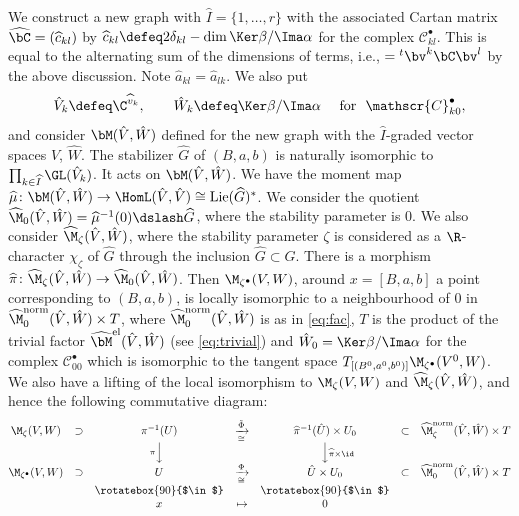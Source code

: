 We construct a new graph with $\widehat I = \{1, \dots, r\}$ with the
associated Cartan matrix $\widehat{\bC} = (\widehat{c}_{kl})$ by
\(
  \widehat{c}_{kl} \defeq 2\delta_{kl} - \dim \Ker\beta/\Ima\alpha
\)
for the complex $\mathscr{C}^\bullet_{kl}$.
This is equal to the alternating sum of the dimensions of terms,
i.e.,
\(
  = {}^t \bv^k \bC \bv^l
\)
by the above discussion. Note $\widehat{a}_{kl} = \widehat{a}_{lk}$.
%
We also put
\begin{equation*}
   \hat V_k \defeq \C^{\widehat{v}_k}, \qquad
   \hat W_k \defeq \text{$\Ker\beta/\Ima\alpha$ \quad
     for \   $\mathscr{C}_{k0}^\bullet$},
\end{equation*}
and consider $\bM(\hat V,\hat W)$ def\/ined for the new graph
with the $\widehat I$-graded vector spaces $\hat V$, $\hat W$.
The stabilizer $\widehat G$ of $(B,a,b)$ is naturally isomorphic to
$\prod_{k\in\widehat I} \GL(\hat V_k)$. It acts on $\bM(\hat V,\hat
W)$. We have the moment map $\widehat\mu\colon\bM(\hat V,\hat W)\to
\HomL(\hat V,\hat V) \cong \operatorname{Lie}(\widehat G)^*$. We
consider the quotient
$\widehat\M_0(\Hat{V},\Hat{W}) = \widehat\mu^{-1}(0)\dslash \widehat
G$, where the stability parameter is $0$.
%
We also consider $\widehat\M_\zeta(\Hat{V},\Hat{W})$, where the
stability parameter $\zeta$ is considered as a $\R$-character
$\chi_{\zeta}$ of $\widehat G$ through the inclusion $\widehat
G\subset G$. There is a morphism
$\widehat\pi\colon \widehat\M_\zeta(\Hat{V},\Hat{W})
\to \widehat\M_0(\Hat{V},\Hat{W})$.
%
Then \cite[3.2.1]{Na-qaff} $\M_{\zeta^\bullet}(V,W)$, around $x =
[B,a,b]$ a point corresponding to $(B,a,b)$, is locally isomorphic to
a neighbourhood of $0$ in
$\widehat\M_0^{\text{norm}}(\Hat{V},\Hat{W})\times T$, where
$\widehat\M_0^{\text{norm}}(\Hat{V},\Hat{W})$ is as in \eqref{eq:fac},
%
$T$ is the product of the trivial factor
$\widehat{\bM}^{\text{el}}(\Hat{V},\Hat{W})$ (see \eqref{eq:trivial})
and $\Hat{W}_0 = \Ker\beta/\Ima\alpha$ for the complex
$\mathscr{C}^\bullet_{00}$ which is isomorphic to the tangent space
\linebreak[2] $T_{[(B^0,a^0,b^0)]}\M_{\zeta^\bullet}(V^0,W)$.
%
We also have a lifting of the local isomorphism to $\M_\zeta(V,W)$ and
$\widehat\M_{\zeta}(\Hat{V},\Hat{W})$, and hence the following
commutative diagram:
\begin{equation}\label{eq:diagram}
    \begin{matrix}
   \M_{\zeta}(V,W) & \supset & \pi^{-1}(U) & \xrightarrow[\cong]{\tilde\Phi}
    & \widehat\pi^{-1}(\Hat{U})\times U_0  & \subset &
    \widehat\M_\zeta^{\text{norm}}(\Hat{V},\Hat{W})\times T
\\
   && \vcenter{%
     \llap{$\scriptstyle{\pi}$}}
   \Big\downarrow && \Big\downarrow
   \vcenter{%
     \rlap{$\scriptstyle{\widehat\pi}\times\id$}}
   &&
\\
   \M_{\zeta^\bullet}(V,W) & \supset & U & \xrightarrow[\cong]{\Phi}
    & \Hat{U}\times U_0 & \subset &
    \widehat\M_0^{\text{norm}}(\Hat{V},\Hat{W})\times
    T
\\
   && \rotatebox{90}{$\in$} & & \rotatebox{90}{$\in$} &&
\\
   && x & \mapsto & 0 &&
  \end{matrix}
\end{equation}
